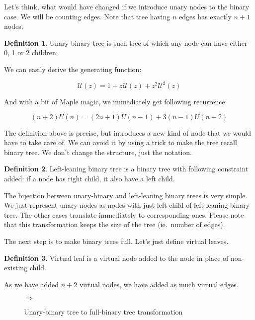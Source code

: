 \documentclass[final]{article}
\theoremstyle{definition}
\newtheorem{definition}{Definition}[subsection]
\theoremstyle{remark}
\newcommand{\gf}[1]{\ensuremath{\mathcal{#1}}}
\newcommand{\includeinlinesvg}[2]{\begin{minipage}{#1\textwidth}\end{minipage}}
\begin{document}
Let's think, what would have changed if we introduce unary nodes to the binary case\cite{motzkin}. We will be counting edges. Note that tree having \(n\) edges has exactly \(n + 1\) nodes.

\begin{definition}
    Unary-binary tree is such tree of which any node can have either 0, 1 or 2 children.
\end{definition}

We can easily derive the generating function:

\[\gf{U}(z) = 1 + z\gf{U}(z) + z^2 \gf{U}^2(z)\]

And with a bit of Maple magic, we immediately get following recurrence:

\[(n + 2)U(n) = (2n + 1)U(n - 1) + 3(n - 1)U(n - 2)\]

The definition above is precise, but introduces a new kind of node that we would have to take care of. We can avoid it by using a trick to make the tree recall binary tree. We don't change the structure, just the notation.

\begin{definition}
    \label{def:unary_binary_2}
    Left-leaning binary tree is a binary tree with following constraint added: if a node has right child, it also have a left child.
\end{definition}

The bijection between unary-binary and left-leaning binary trees is very simple. We just represent unary nodes as nodes with just left child of left-leaning binary tree. The other cases translate immediately to corresponding ones. Please note that this transformation keeps the size of the tree (ie.~number of edges).

The next step is to make binary trees full. Let's just define virtual leaves.

\begin{definition}
    Virtual leaf is a virtual node added to the node in place of non-existing child.
\end{definition}

As we have added \(n + 2\) virtual nodes, we have added as much virtual edges.

\begin{figure}[h]
    \centering
    \includeinlinesvg{.2}{unary_binary__base}%
    \(\Rightarrow\)%
    \includeinlinesvg{.3}{unary_binary__full}
    \caption{Unary-binary tree to full-binary tree transformation}
    \label{fig:unary_binary_transformation}
\end{figure}
\end{document}
